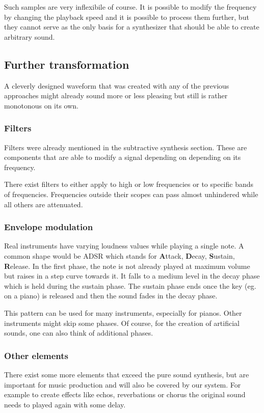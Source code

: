 				Such samples are very inflexibile of course.
				It is possible to modify the frequency by changing the playback speed and it is possible to	process them further, but they cannot serve as the only basis for a synthesizer that should be able to create arbitrary sound.			
		\subsection{Further transformation}

			A cleverly designed waveform that was created with any of the previous approaches might already sound more or less pleasing but still is rather monotonous on its own.
			
			\subsubsection{Filters} 
				\label{subsec:filters}
				Filters were already mentioned in the subtractive synthesis section. 
				These are components that are able to modify a signal depending on depending on its frequency.
				
				There exist filters to either apply to high or low frequencies or to specific bands of frequencies.
				Frequencies outside their scopes can pass almost unhindered while all others are attenuated.
			\subsubsection{Envelope modulation}
				Real instruments have varying loudness values while playing a single note.
				A common shape would be	ADSR which stands for \textbf{A}ttack, \textbf{D}ecay, \textbf{S}ustain, \textbf{R}elease.
				In the first phase, the note is not already played at maximum volume but raises in a step curve towards it.
				It falls to a medium level in the decay phase which is held during the sustain phase.
				The sustain phase ends once the key (eg. on a piano) is released and then the sound fades in the decay phase.
				
				This pattern can be used for many instruments, especially for pianos. 
				Other instruments might skip some phases. 
				Of course, for the creation of artificial sounds, one can also think of additional phases.
			
				
			\subsubsection{Other elements}
				There exist some more elements that exceed the pure sound synthesis, but are important for music production and will also be covered by our system.
				For example to create effects like echos, reverbations or chorus the original sound needs to played again with some delay.
			
